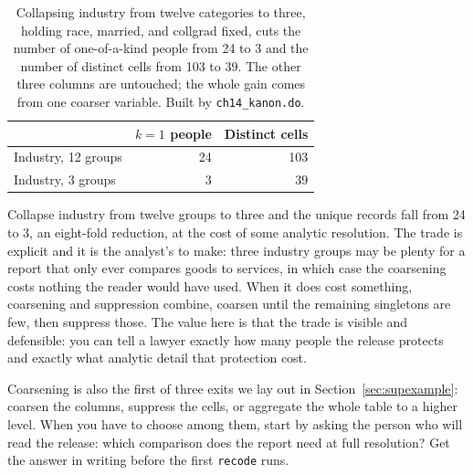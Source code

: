 \begin{table}[htbp]
\centering
{\footnotesize
\begin{tabular}{lrr}
\hline
                       & $k=1$ people & Distinct cells \\
\hline
Industry, 12 groups    & 24 & 103 \\
Industry, 3 groups     &  3 &  39 \\
\hline
\end{tabular}
}
\caption[Coarsening industry collapses unique records]{Collapsing industry from twelve categories to three, holding race, married, and collgrad fixed, cuts the number of one-of-a-kind people from 24 to 3 and the number of distinct cells from 103 to 39. The other three columns are untouched; the whole gain comes from one coarser variable. Built by \texttt{ch14\_kanon.do}.}
\label{tab:coarsen}
\end{table}

Collapse industry from twelve groups to three and the unique records fall from 24 to 3, an eight-fold reduction, at the cost of some analytic resolution.  The trade is explicit and it is the analyst's to make: three industry groups may be plenty for a report that only ever compares goods to services, in which case the coarsening costs nothing the reader would have used. When it does cost something, coarsening and suppression combine, coarsen until the remaining singletons are few, then suppress those. The value here is that the trade is visible and defensible: you can tell a lawyer exactly how many people the release protects and exactly what analytic detail that protection cost.

Coarsening is also the first of three exits we lay out in Section~\ref{sec:supexample}: coarsen the columns, suppress the cells, or aggregate the whole table to a higher level. When you have to choose among them, start by asking the person who will read the release: which comparison does the report need at full resolution? Get the answer in writing before the first \texttt{recode} runs.

